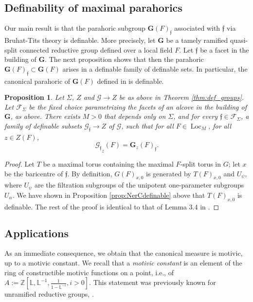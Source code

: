 \documentclass{amsart}
\newcommand{\Z}{{\mathbb Z}}
\newcommand{\cF}{\mathcal{F}}
\newcommand{\loc}{\operatorname{Loc}}
\newcommand{\bG}{\mathbf{G}}
\newcommand{\cG}{\mathcal{G}}
\newcommand{\ff}{{\mathfrak f}}
\newcommand\lef{\mathbb L}
\theoremstyle{plain}
\newtheorem{prop}[thm]{Proposition}
\theoremstyle{definition}
\begin{document}
\subsection{Definability of maximal parahorics} 
Our main result is that 
the parahoric subgroup $\bG(F)_\ff$ associated with $\ff$ via Bruhat-Tits theory is definable.  
More precisely, let $\bG$ be a tamely ramified quasi-split connected reductive group defined over a local field $F$. Let $\ff$ be a facet in the building of $\bG$.  The next proposition shows that
then the parahoric $\bG(F)_\ff\subset \bG(F)$ arises in a definable family of definable sets. 
In particular, the canonical parahoric of $\bG(F)$ defined in \cite{gross:motive} is definable. 

\begin{prop} Let $\Sigma$, $Z$ and $\cG\to Z$ be as above in Theorem \ref{thm:def_groups}.
Let $\cF_{\Sigma}$ be the fixed choice parametrizing the facets of an alcove in the building of $\bG$, as above.  
There exists $M>0$ that depends only on $\Sigma$, and for every $\ff\in \cF_\Sigma$, a family of definable subsets $\cG_{\ff} \to Z$ of $\cG$, such that for all $F\in \loc_M$, for all $z\in Z(F)$, 
$${\cG_{\ff}}_{z}(F)= \bG_z(F)_{\ff}.$$
\end{prop}

\begin{proof} Let $T$ be a maximal torus containing the maximal $F$-split torus in $G$; let $x$ be the baricentre of $\ff$.
By definition, $G(F)_{x,0}$ is generated by $T(F)_{x, 0}$ and $U_\psi$, where $U_\psi$ are the filtration subgroups of the unipotent one-parameter subgroups $U_{\alpha}$. 
We have shown in Proposition \ref{prop:NerCdefinable} above that  $T(F)_{x, 0}$ is definable. The rest of the proof is identical to that of Lemma 3.4 in \cite{CGH-2}.  
\end{proof} 

\subsection{Applications} 
As an immediate consequence, we obtain that the canonical measure is motivic, up to a motivic constant. 
We recall that a \emph{motivic constant} is an element of the ring of constructible motivic functions on a point, i.e.,  of $A:=\Z[\lef, \lef^{-1}, \frac{1}{1-\lef^{-i}}, i>0]$. 
This statement was previously known for unramified reductive groups, \cite{cluckers-hales-loeser}. 
\end{document}
